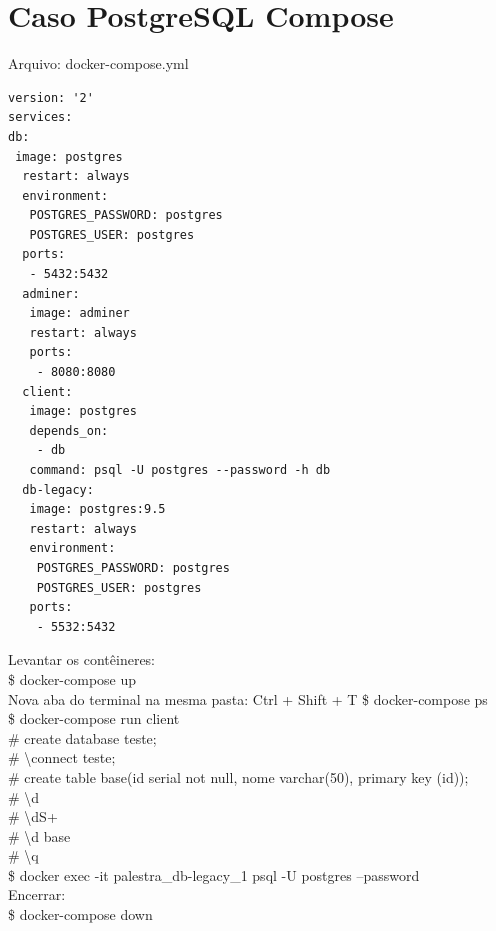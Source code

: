 \documentclass[a4paper,11pt]{article}
\begin{document}
\section{Caso PostgreSQL Compose}
Arquivo: docker-compose.yml
\begin{lstlisting}
version: '2'
services:
db:
 image: postgres
  restart: always
  environment:
   POSTGRES_PASSWORD: postgres
   POSTGRES_USER: postgres
  ports:
   - 5432:5432
  adminer:
   image: adminer
   restart: always
   ports:
    - 8080:8080
  client:
   image: postgres
   depends_on:
    - db
   command: psql -U postgres --password -h db
  db-legacy:
   image: postgres:9.5
   restart: always
   environment:
    POSTGRES_PASSWORD: postgres
    POSTGRES_USER: postgres
   ports:
    - 5532:5432
\end{lstlisting}
Levantar os contêineres: \\
{\ttfamily\$ docker-compose up} \\[2mm]
Nova aba do terminal na mesma pasta: Ctrl + Shift + T
{\ttfamily\$ docker-compose ps} \\
{\ttfamily\$ docker-compose run client} \\
{\ttfamily\# create database teste;} \\
{\ttfamily\# \textbackslash connect teste;} \\
{\ttfamily\# create table base(id serial not null, nome varchar(50), primary key (id));} \\
{\ttfamily\# \textbackslash d} \\
{\ttfamily\# \textbackslash dS+} \\
{\ttfamily\# \textbackslash d base} \\
{\ttfamily\# \textbackslash q} \\
{\ttfamily\$ docker exec -it palestra\_db-legacy\_1 psql -U postgres --password} \\[2mm]
Encerrar: \\
{\ttfamily\$ docker-compose down}
\end{document}
